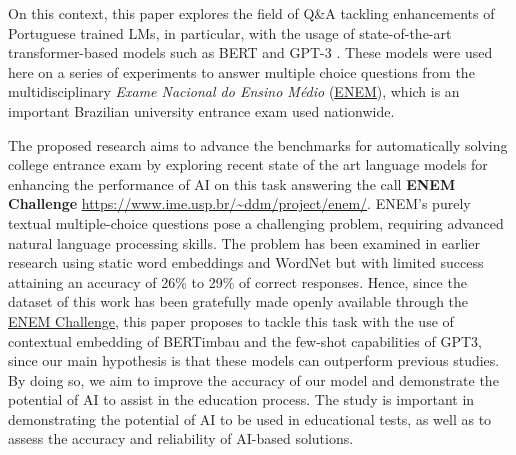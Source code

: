 \documentclass{article}
\begin{document}
On this context, this paper explores the field of Q\&A tackling enhancements of Portuguese trained LMs, in particular, with the usage of state-of-the-art transformer-based models \cite{VaswaniAttentionAllYou2017a} such as BERT \cite{devlin2018bert} and GPT-3 \cite{https://doi.org/10.48550/arxiv.2005.14165}. These models were used here on a series of experiments to answer multiple choice questions from the multidisciplinary \textit{Exame Nacional do Ensino Médio} (\href{https://www.gov.br/inep/pt-br/areas-de-atuacao/avaliacao-e-exames-educacionais/enem}{\underline{ENEM}}), which is an important Brazilian university entrance exam used nationwide. 

The proposed research aims to advance the benchmarks for automatically solving college entrance exam by exploring recent state of the art language models for enhancing the performance of AI on this task answering the call \textbf{ENEM Challenge}  \url{https://www.ime.usp.br/~ddm/project/enem/}. ENEM's purely textual multiple-choice questions pose a challenging problem, requiring advanced natural language processing skills. The problem has been examined in earlier research \cite{8575587} using static word embeddings and WordNet but with limited success attaining an accuracy of 26\% to 29\% of correct responses. Hence, since the dataset of this work has been gratefully made openly available through the \href{https://www.ime.usp.br/~ddm/project/enem/}{\underline{ENEM Challenge}}, this paper proposes to tackle this task with the use of contextual embedding of BERTimbau and the few-shot capabilities of GPT3, since our main hypothesis is that these models can outperform previous studies. By doing so, we aim to improve the accuracy of our model and demonstrate the potential of AI to assist in the education process. The study is important in demonstrating the potential of AI to be used in educational tests, as well as to assess the accuracy and reliability of AI-based solutions. 


\end{document}
